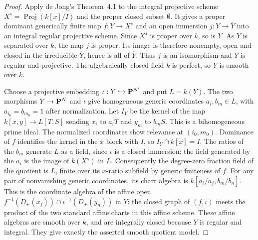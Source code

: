 \begin{proof}
Apply de Jong's Theorem~4.1 to the integral projective scheme
$X^s=\operatorname{Proj}(k[x]/I)$ and the proper closed subset $\emptyset$.
It gives a proper dominant generically finite map $f:Y\to X^s$ and an open
immersion $j:Y\to\overline Y$ into an integral regular projective scheme.
Since $X^s$ is proper over $k$, so is $Y$. As $\overline Y$ is separated over
$k$, the map $j$ is proper. Its image is therefore nonempty, open and closed
in the irreducible $\overline Y$, hence is all of $\overline Y$. Thus $j$ is
an isomorphism and $Y$ is regular and projective. The algebraically closed
field $k$ is perfect, so $Y$ is smooth over $k$.

Choose a projective embedding $\iota:Y\hookrightarrow\mathbf{P}^{N'}$ and put
$L=k(Y)$. The two morphisms $Y\to\mathbf{P}^N$ and $\iota$ give homogeneous generic
coordinates $a_i,b_m\in L$, with $a_{i_0}=b_{m_0}=1$ after normalization.
Let $I_Y$ be the kernel of the map
$k[x,y]\to L[T,S]$ sending $x_i$ to $a_iT$ and $y_m$ to $b_mS$.
This is a bihomogeneous prime ideal. The normalized coordinates show relevance
at $(i_0,m_0)$. Dominance of $f$ identifies the kernel in the $x$ block with
$I$, so $I_Y\cap k[x]=I$. The ratios of the $b_m$ generate $L$ as a field,
since $\iota$ is a closed immersion; the field generated by the $a_i$ is the
image of $k(X^s)$ in $L$. Consequently the degree-zero fraction field of the
quotient is $L$, finite over its $x$-ratio subfield by generic finiteness of $f$.
For any pair of nonvanishing generic coordinates, its chart algebra is
$k[a_i/a_j,b_m/b_n]$. This is the coordinate algebra of the affine open
$f^{-1}(D_+(x_j))\cap\iota^{-1}(D_+(y_n))$ in $Y$: the closed graph of $(f,\iota)$ meets the product of the two
standard affine charts in this affine scheme. These affine
algebras are smooth over $k$, and are integrally closed because $Y$ is regular
and integral. They give exactly the asserted smooth quotient model.
\end{proof}

